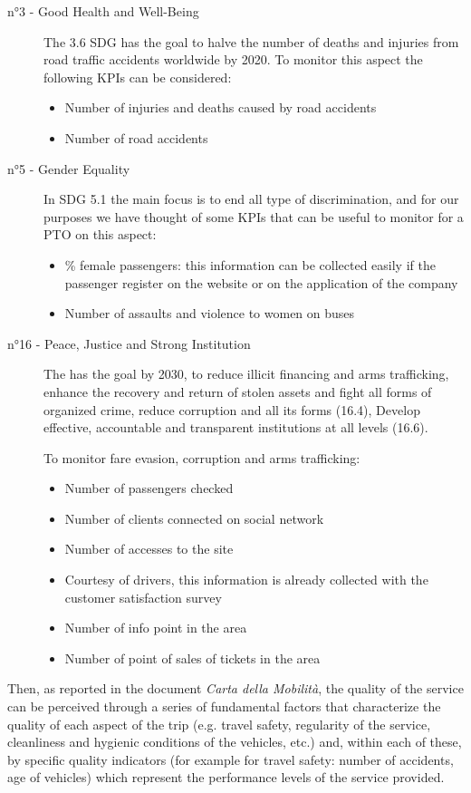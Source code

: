 \begin{description}
   \item[n°3 - Good Health and Well-Being] The 3.6 SDG has the goal to halve the number of deaths and injuries from road traffic accidents worldwide by 2020. To monitor this aspect the following KPIs can be considered: 
   \begin{itemize}
       \item Number of injuries and deaths caused by road accidents
       \item Number of road accidents
   \end{itemize}
   \item[n°5 - Gender Equality]In SDG 5.1 the main focus is to end all type of discrimination, and for our purposes we have thought of some KPIs that can be useful to monitor for a PTO on this aspect: 
    \begin{itemize}
       \item \% female passengers: this information can be collected easily if the passenger register on the website or on the application of the company 
       \item Number of assaults and violence to women on buses
   \end{itemize}
   \item[n°16 - Peace, Justice and Strong Institution ]The has the goal by 2030, to reduce illicit financing and arms trafficking, enhance the recovery and return of stolen assets and fight all forms of organized crime, reduce corruption and all its forms (16.4), Develop effective, accountable and transparent institutions at all levels (16.6). 
   
   To monitor fare evasion, corruption and arms trafficking:
    \begin{itemize}
       \item Number of passengers checked
       \item Number of clients connected on social network
       \item Number of accesses to the site
       \item Courtesy of drivers, this information is already collected with the customer satisfaction survey
       \item Number of info point in the area 
       \item Number of point of sales of tickets in the area
   \end{itemize}
\end{description}

Then, as reported in the document \textit{Carta della Mobilità}, the quality of the service can be perceived through a series of fundamental factors that characterize the quality of each aspect of the trip (e.g. travel safety, regularity of the service, cleanliness and hygienic conditions of the vehicles, etc.) and, within each of these, by specific quality indicators (for example for travel safety: number of accidents, age of vehicles) which represent the performance levels of the service provided.

